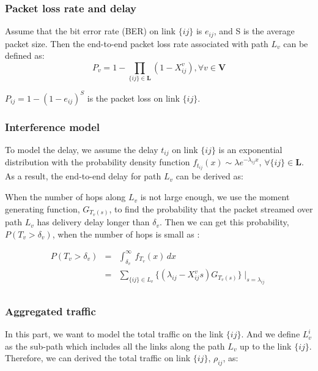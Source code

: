 \subsubsection{Packet loss rate and delay}
Assume that the bit error rate (BER) on link $\lbrace ij \rbrace$
is $e_{ij}$, and S is the average packet size. Then the end-to-end
packet loss rate associated with path $L_v$ can be defined as:
\begin{equation} P_v = 1 -  \prod_{{\lbrace ij
\rbrace \in \mathbf{L}}} (1- X ^{v}_{ij}), \forall v \in
\mathbf{V}
\end{equation}

$P_{ij} = 1-(1-e_{ij})^S$ is the packet loss on link $\lbrace ij
\rbrace$.

\subsubsection{Interference model}
To model the delay, we assume the delay $t_{ij}$ on link $\lbrace
ij \rbrace$ is an exponential distribution with the probability
density function $f_{t_{ij}}(x) \sim \lambda e^{-\lambda_{ij}x}$,
$\forall \lbrace ij \rbrace \in \mathbf{L}$. As a result, the
end-to-end delay for path $L_v$ can be derived as:

When the number of hops along $L_v$ is not large enough, we use
the moment generating function, $G_{T_v(s)}$, to find the
probability that the packet streamed over path $L_v$ has delivery
delay longer than $\delta_v$. Then we can get this probability,
$P(T_v>\delta_v)$, when the number of hops is small as
\cite{error}:

\begin{eqnarray}
P(T_v>\delta_v)&=&\int_{\delta_v}^{\infty} \, f_{T_v}(x)\, dx \nonumber\\
               &=&\sum_{\lbrace ij \rbrace \in L_v} \lbrace
(\lambda_{ij}-X_{ij}^vs)G_{T_v(s)}\rbrace \mid_{s=\lambda_{ij}} \nonumber\\
\end{eqnarray}

\subsubsection{Aggregated traffic}
In this part, we want to model the total traffic on the link
$\lbrace ij \rbrace$. And we define $L_v^i$ as the sub-path which
includes all the links along the path $L_v$ up to the link
$\lbrace ij \rbrace$. Therefore, we can derived the total traffic
on link $\lbrace ij \rbrace$, $\rho_{ij}$, as:

